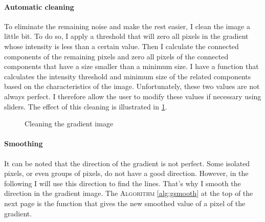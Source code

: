 \documentclass[11pt]{article}
\begin{document}
	\paragraph{Automatic cleaning}
	To eliminate the remaining noise and make the rest easier, I clean the image a little bit. To do so, I apply a threshold that will zero all pixels in the gradient whose intensity is less than a certain value. Then I calculate the connected components of the remaining pixels and zero all pixels of the connected components that have a size smaller than a minimum size. I have a function that calculates the intensity threshold and minimum size of the related components based on the characteristics of the image. Unfortunately, these two values are not always perfect. I therefore allow the user to modify these values if necessary using sliders. The effect of this cleaning is illustrated in \figurename \ref{im:clean}.
	
	\begin{figure}[h]
		\centering
		\vspace{-1mm}
		\caption{Cleaning the gradient image}
		\label{im:clean}
	\end{figure}

	\paragraph{Smoothing}
	It can be noted that the direction of the gradient is not perfect. Some isolated pixels, or even groups of pixels, do not have a good direction. However, in the following I will use this direction to find the lines. That's why I smooth the direction in the gradient image. The \textsc{Algorithm} \ref{alg:gsmooth} at the top of the next page is the function that gives the new smoothed value of a pixel of the gradient.
	
\end{document}
